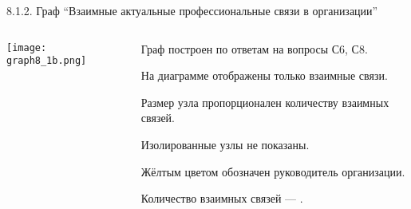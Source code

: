 \begin{frame}{8.1.2. Граф ``Взаимные актуальные профессиональные связи в организации''}

\begin{columns}
\begin{column}{0.75\textwidth} 
\centering
          \texttt{[image: graph8\_1b.png]}
\end{column}
\begin{column}{0.25\textwidth} 

\tiny
Граф построен по ответам на вопросы С6, С8.
\smallskip

На диаграмме отображены только взаимные связи.
\smallskip

Размер узла пропорционален количеству взаимных связей.
\smallskip

Изолированные узлы не показаны.
\smallskip

Жёлтым цветом обозначен руководитель организации.
\bigskip

Количество взаимных связей --- \valHABlinks.


\end{column}
\end{columns}
\end{frame}


